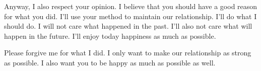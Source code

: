 Anyway, I also respect your opinion. I believe that you should have a good reason for what you did. I'll use your method to maintain our relationship. I'll do what I should do. I will not care what happened in the past. I'll also not care what will happen in the future. I'll enjoy today happiness as much as possible.

Please forgive me for what I did. I only want to make our relationship as strong as possible. I also want you to be happy as much as possible as well.

